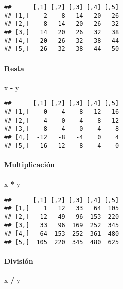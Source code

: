 \documentclass[11pt,]{article}
\newenvironment{Shaded}{\begin{snugshade}}{\end{snugshade}}
\newcommand{\NormalTok}[1]{#1}
\newcommand{\OperatorTok}[1]{\textcolor[rgb]{0.81,0.36,0.00}{\textbf{#1}}}
\newcommand{\StringTok}[1]{\textcolor[rgb]{0.31,0.60,0.02}{#1}}
\begin{document}
\begin{verbatim}
##      [,1] [,2] [,3] [,4] [,5]
## [1,]    2    8   14   20   26
## [2,]    8   14   20   26   32
## [3,]   14   20   26   32   38
## [4,]   20   26   32   38   44
## [5,]   26   32   38   44   50
\end{verbatim}

\hypertarget{resta}{%
\paragraph{Resta}\label{resta}}

\begin{Shaded}
\begin{Highlighting}[]
\NormalTok{x }\OperatorTok{-}\StringTok{ }\NormalTok{y}
\end{Highlighting}
\end{Shaded}

\begin{verbatim}
##      [,1] [,2] [,3] [,4] [,5]
## [1,]    0    4    8   12   16
## [2,]   -4    0    4    8   12
## [3,]   -8   -4    0    4    8
## [4,]  -12   -8   -4    0    4
## [5,]  -16  -12   -8   -4    0
\end{verbatim}

\hypertarget{multiplicaciuxf3n}{%
\paragraph{Multiplicación}\label{multiplicaciuxf3n}}

\begin{Shaded}
\begin{Highlighting}[]
\NormalTok{x }\OperatorTok{*}\StringTok{ }\NormalTok{y}
\end{Highlighting}
\end{Shaded}

\begin{verbatim}
##      [,1] [,2] [,3] [,4] [,5]
## [1,]    1   12   33   64  105
## [2,]   12   49   96  153  220
## [3,]   33   96  169  252  345
## [4,]   64  153  252  361  480
## [5,]  105  220  345  480  625
\end{verbatim}

\hypertarget{divisiuxf3n}{%
\paragraph{División}\label{divisiuxf3n}}

\begin{Shaded}
\begin{Highlighting}[]
\NormalTok{x }\OperatorTok{/}\StringTok{ }\NormalTok{y}
\end{Highlighting}
\end{Shaded}
\end{document}

